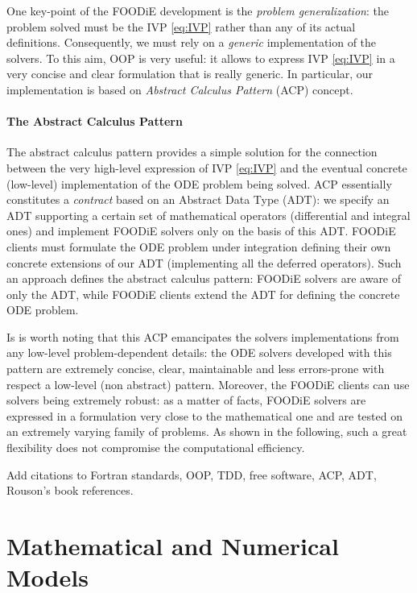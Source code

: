 \documentclass[pdftex,preprint,3p,times,numbers]{elsarticle}
\begin{document}
One key-point of the FOODiE development is the \emph{problem generalization}: the problem solved must be the IVP \ref{eq:IVP} rather than any of its actual definitions. Consequently, we must rely on a \emph{generic} implementation of the solvers. To this aim, OOP is very useful: it allows to express IVP \ref{eq:IVP} in a very concise and clear formulation that is really generic. In particular, our implementation is based on \emph{Abstract Calculus Pattern} (ACP) concept.

\paragraph{The Abstract Calculus Pattern}
The abstract calculus pattern provides a simple solution for the connection between the very high-level expression of IVP \ref{eq:IVP} and the eventual concrete (low-level) implementation of the ODE problem being solved. ACP essentially constitutes a \emph{contract} based on an Abstract Data Type (ADT): we specify an ADT supporting a certain set of mathematical operators (differential and integral ones) and implement FOODiE solvers only on the basis of this ADT. FOODiE clients must formulate the ODE problem under integration defining their own concrete extensions of our ADT (implementing all the deferred operators). Such an approach defines the abstract calculus pattern: FOODiE solvers are aware of only the ADT, while FOODiE clients extend the ADT for defining the concrete ODE problem.

Is is worth noting that this ACP emancipates the solvers implementations from any low-level problem-dependent details: the ODE solvers developed with this pattern are extremely concise, clear, maintainable and less errors-prone with respect a low-level (non abstract) pattern. Moreover, the FOODiE clients can use solvers being extremely robust: as a matter of facts, FOODiE solvers are expressed in a formulation very close to the mathematical one and are tested on an extremely varying family of problems. As shown in the following, such a great flexibility does not compromise the computational efficiency.

{\color{red} Add citations to Fortran standards, OOP, TDD, free software, ACP, ADT, Rouson's book references.}

\section{Mathematical and Numerical Models}\label{sec:MNmodels}
\end{document}
